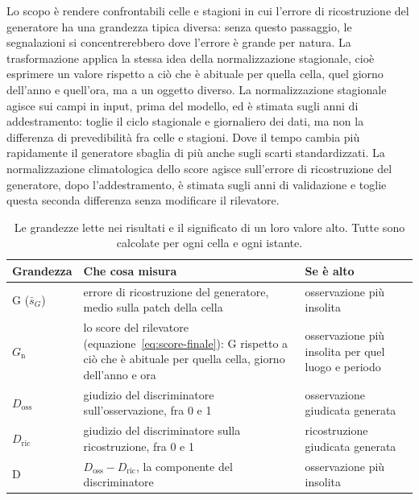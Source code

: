 Lo scopo è rendere confrontabili celle e stagioni in cui l'errore di ricostruzione del generatore ha una grandezza tipica diversa: senza questo passaggio, le segnalazioni si concentrerebbero dove l'errore è grande per natura. La trasformazione applica la stessa idea della normalizzazione stagionale, cioè esprimere un valore rispetto a ciò che è abituale per quella cella, quel giorno dell'anno e quell'ora, ma a un oggetto diverso. La normalizzazione stagionale agisce sui campi in input, prima del modello, ed è stimata sugli anni di addestramento: toglie il ciclo stagionale e giornaliero dei dati, ma non la differenza di prevedibilità fra celle e stagioni. Dove il tempo cambia più rapidamente il generatore sbaglia di più anche sugli scarti standardizzati. La normalizzazione climatologica dello score agisce sull'errore di ricostruzione del generatore, dopo l'addestramento, è stimata sugli anni di validazione e toglie questa seconda differenza senza modificare il rilevatore.

\begin{table}[!t]
    \centering
    \footnotesize
    \caption{Le grandezze lette nei risultati e il significato di un loro valore alto. Tutte sono calcolate per ogni cella e ogni istante.}
    \label{tab:ris-score}
    \vspace{0.6em}
    \renewcommand{\arraystretch}{1.15}
    \begin{tabular}{@{}L{0.14}L{0.46}L{0.32}@{}}
        \toprule
        Grandezza & Che cosa misura & Se è alto \\
        \midrule
        G ($\bar{s}_G$) & errore di ricostruzione del generatore, medio sulla patch della cella & osservazione più insolita \\
        \addlinespace
        $G_{\mathrm{n}}$ & lo score del rilevatore (equazione~\eqref{eq:score-finale}): G rispetto a ciò che è abituale per quella cella, giorno dell'anno e ora & osservazione più insolita per quel luogo e periodo \\
        \addlinespace
        $D_{\mathrm{oss}}$ & giudizio del discriminatore sull'osservazione, fra 0 e 1 & osservazione giudicata generata \\
        \addlinespace
        $D_{\mathrm{ric}}$ & giudizio del discriminatore sulla ricostruzione, fra 0 e 1 & ricostruzione giudicata generata \\
        \addlinespace
        D & $D_{\mathrm{oss}}-D_{\mathrm{ric}}$, la componente del discriminatore & osservazione più insolita \\
        \bottomrule
    \end{tabular}
\end{table}


